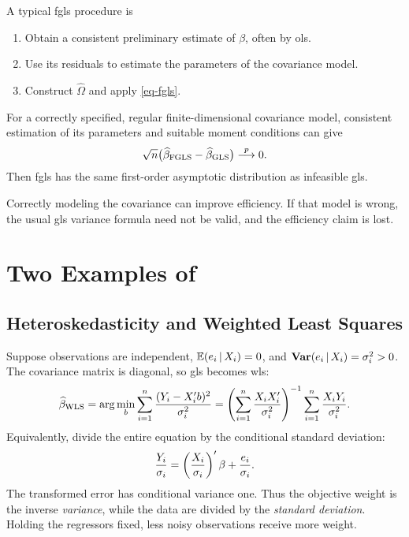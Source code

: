 \documentclass[a4paper,12pt]{article}
\begin{document}
\begin{definition}
	A typical \gls{fgls} procedure is
	\begin{enumerate}
		\item Obtain a consistent preliminary estimate of $\beta$, often by \gls{ols}.
		\item Use its residuals to estimate the parameters of the covariance model.
		\item Construct $\widehat\Omega$ and apply \eqref{eq-fgls}.
	\end{enumerate}
\end{definition}

\begin{remark}
	For a correctly specified, regular finite-dimensional covariance model,
	consistent estimation of its parameters and suitable moment conditions can give
	\begin{align}
		\sqrt n\bigl(\widehat\beta_{\mathrm{FGLS}}-\widehat\beta_{\mathrm{GLS}}\bigr)\overset{p}{\longrightarrow}0.
	\end{align}
	Then \gls{fgls} has the same first-order asymptotic distribution as infeasible \gls{gls}.
\end{remark}

\begin{remark}
    Correctly modeling the covariance can improve efficiency.
    If that model is wrong, the usual \gls{gls} variance formula need not be valid,
    and the efficiency claim is lost.
\end{remark}

\section{Two Examples of }

\subsection{Heteroskedasticity and Weighted Least Squares}

Suppose observations are independent, $\operatorname{\mathbb{E}}(e_i\mathpunct{}|\mathpunct{} X_i)=0$, and
$\operatorname{\text{\textrm{\upshape\textbf{Var}}}}(e_i\mathpunct{}|\mathpunct{} X_i)=\sigma_i^2>0$.
The covariance matrix is diagonal, so \gls{gls} becomes \gls{wls}:
\begin{align}
    \widehat\beta_{\mathrm{WLS}}
    =\arg\min_b\sum_{i=1}^n\frac{(Y_i-X_i^{\prime} b)^2}{\sigma_i^2}
    =\left(\sum_{i=1}^n\frac{X_iX_i^{\prime}}{\sigma_i^2}\right)^{-1}
      \sum_{i=1}^n\frac{X_iY_i}{\sigma_i^2}.
\end{align}
Equivalently, divide the entire equation by the conditional standard deviation:
\begin{align}
    \frac{Y_i}{\sigma_i}
    =\left(\frac{X_i}{\sigma_i}\right)^{\prime}\beta+\frac{e_i}{\sigma_i}.
\end{align}
The transformed error has conditional variance one.
Thus the objective weight is the inverse \emph{variance},
while the data are divided by the \emph{standard deviation}.
Holding the regressors fixed, less noisy observations receive more weight.
\end{document}
